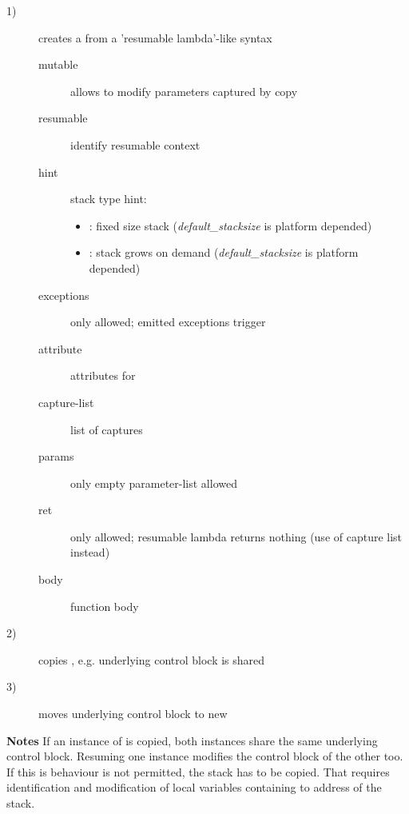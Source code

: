 \begin{description}
    \item[1)] creates a \ectx from a 'resumable lambda'-like syntax
              \begin{description}
                  \item[mutable]      allows to modify parameters captured by copy
                  \item[resumable]    identify resumable context
                  \item[hint]         stack type hint:
                                      \begin{itemize}
                                          \item {}:
                                              fixed size stack (\textit{default\_stacksize} is
                                              platform depended)
                                          \item {}:
                                              stack grows on demand (\textit{default\_stacksize}
                                              is platform depended)
                                      \end{itemize}
                  \item[exceptions]   only  allowed; emitted exceptions
                                      trigger 
                  \item[attribute]    attributes for 
                  \item[capture-list] list of captures
                  \item[params]       only empty parameter-list allowed
                  \item[ret]          only  allowed; resumable lambda returns nothing
                                      (use of capture list instead)
                  \item[body]         function body\\
              \end{description}
    \item[2)] copies \ectx, e.g. underlying control block is shared
    \item[3)] moves underlying control block to new \ectx
\end{description}

{\bf Notes}
\newline
If an instance of \ectx is copied, both instances share the same underlying
control block. Resuming one instance modifies the control block of the other
\ectx too.\\
If this is behaviour is not permitted, the stack has to be copied. That requires
identification and modification of local variables containing to address of the
stack.

